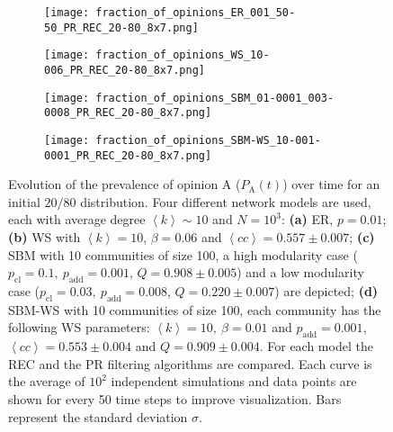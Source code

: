 \documentclass[11 pt , letterpaper , twoside , openright]{book}
\begin{document}
\begin{figure}[H]
  \begin{subfigure}[t]{0.49\textwidth}
  	\texttt{[image: fraction\_of\_opinions\_ER\_001\_50-50\_PR\_REC\_20-80\_8x7.png]}
      \end{subfigure}
  \begin{subfigure}[t]{0.49\textwidth}
  	\texttt{[image: fraction\_of\_opinions\_WS\_10-006\_PR\_REC\_20-80\_8x7.png]}
    \label{ws_20-80_op}
  \end{subfigure}
  \begin{subfigure}[t]{0.49\textwidth}    
    \texttt{[image: fraction\_of\_opinions\_SBM\_01-0001\_003-0008\_PR\_REC\_20-80\_8x7.png]}
  \end{subfigure}
  \begin{subfigure}[t]{0.49\textwidth}
    \texttt{[image: fraction\_of\_opinions\_SBM-WS\_10-001-0001\_PR\_REC\_20-80\_8x7.png]}
    \label{sbm-ws_20-80_op}
  \end{subfigure}
  \captionsetup{format=plain}
  \caption[Evolution of the prevalence of opinion A ($P_\text{A}(t)$) over time for an initial $20/80$ opinion distribution.]{Evolution of the prevalence of opinion A ($P_\text{A}(t)$) over time for an initial $20/80$ distribution. Four different network models are used, each with average degree $\left<k\right> \sim 10$ and $N = 10^3$: \textbf{(a)} ER, $p=0.01$; \textbf{(b)} WS with $\left<k\right> = 10$, $\beta = 0.06$ and $\left<cc\right> = 0.557 \pm 0.007$; \textbf{(c)} SBM with 10 communities of size 100, a high modularity case ($p_{\text{cl}} = 0.1,\ p_{\text{add}} = 0.001$, $Q = 0.908 \pm 0.005$) and a low modularity case ($p_{\text{cl}} = 0.03,\ p_{\text{add}} = 0.008$, $Q = 0.220 \pm 0.007$) are depicted; \textbf{(d)} SBM-WS with 10 communities of size 100, each community has the following WS parameters: $\left<k\right> = 10,\ \beta = 0.01$ and $p_{\text{add}} = 0.001$, $\left<cc\right> = 0.553 \pm 0.004$ and $Q = 0.909 \pm 0.004$. For each model the REC and the PR filtering algorithms are compared. Each curve is the average of $10^2$ independent simulations and data points are shown for every 50 time steps to improve visualization. Bars represent the standard deviation $\sigma$.}
\label{ev_op_20_80}
\end{figure}
\end{document}
